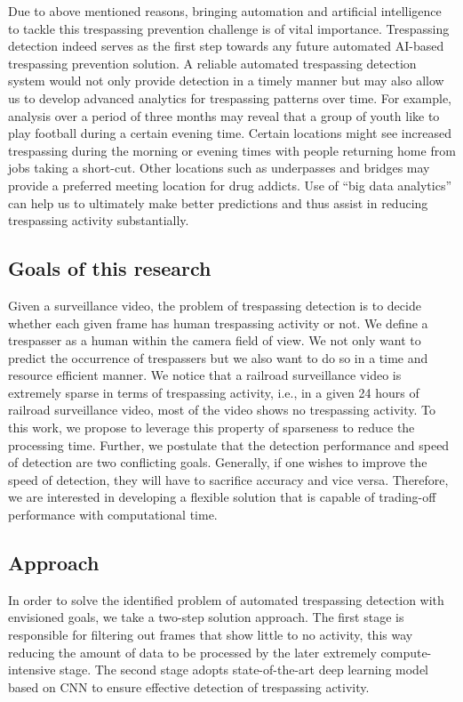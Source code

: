 Due to above mentioned reasons, bringing automation and artificial intelligence to tackle this trespassing prevention challenge is of vital importance. Trespassing detection indeed serves as the first step towards any future automated AI-based trespassing prevention solution. A reliable automated trespassing detection system would not only provide detection in a timely manner but may also allow us to develop advanced analytics for trespassing patterns over time. For example, analysis over a period of three months may reveal that a group of youth like to play football during a certain evening time. Certain locations might see increased trespassing during the morning or evening times with people returning home from jobs taking a short-cut. Other locations such as underpasses and bridges may provide a preferred meeting location for drug addicts. Use of ``big data analytics'' can help us to ultimately make better predictions and thus assist in reducing trespassing activity substantially.
\subsection{Goals of this research}
\label{sec:goal}
Given a surveillance video, the problem of trespassing detection is to decide whether each given frame has human trespassing activity or not. We define a trespasser as a human within the camera field of view. We not only want to predict the occurrence of trespassers but we also want to do so in a time and resource efficient manner. We notice that a railroad surveillance video is extremely sparse in terms of trespassing activity, i.e., in a given 24 hours of railroad surveillance video, most of the video shows no trespassing activity. To this work, we propose to leverage this property of sparseness to reduce the processing time. 
Further, we postulate that the detection performance and speed of detection are two conflicting goals. Generally, if one wishes to improve the speed of detection, they will have to sacrifice accuracy and vice versa. Therefore, we are interested in developing a  flexible solution that is capable of trading-off performance with computational time.
\subsection{Approach}
In order to solve the identified problem of automated trespassing detection with envisioned goals, we take a two-step solution approach. The first stage is responsible for filtering out frames that show little to no activity, this way reducing the amount of data to be processed by the later extremely compute-intensive stage. The second stage adopts state-of-the-art deep learning model based on CNN to ensure effective detection of trespassing activity.
